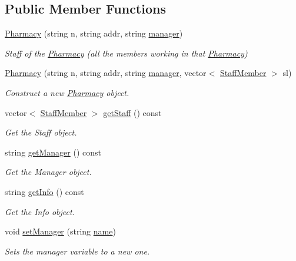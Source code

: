 \subsection*{Public Member Functions}
\begin{DoxyCompactItemize}
\item 
\hyperlink{classPharmacy_ad12ac7a309d2e77742508ecc7bee4453}{Pharmacy} (string n, string addr, string \hyperlink{classPharmacy_a620e101128be08b27f4401d53cfc39e6}{manager})
\begin{DoxyCompactList}\small\item\em Staff of the \hyperlink{classPharmacy}{Pharmacy} (all the members working in that \hyperlink{classPharmacy}{Pharmacy}) \end{DoxyCompactList}\item 
\hyperlink{classPharmacy_adb2b31d515bdf655ac3a952320a09680}{Pharmacy} (string n, string addr, string \hyperlink{classPharmacy_a620e101128be08b27f4401d53cfc39e6}{manager}, vector$<$ \hyperlink{classStaffMember}{Staff\+Member} $>$ sl)
\begin{DoxyCompactList}\small\item\em Construct a new \hyperlink{classPharmacy}{Pharmacy} object. \end{DoxyCompactList}\item 
vector$<$ \hyperlink{classStaffMember}{Staff\+Member} $>$ \hyperlink{classPharmacy_a030c21293a003be529663642a6825590}{get\+Staff} () const
\begin{DoxyCompactList}\small\item\em Get the Staff object. \end{DoxyCompactList}\item 
string \hyperlink{classPharmacy_acfa4217d82d6276e3e82991fdbb3fd13}{get\+Manager} () const
\begin{DoxyCompactList}\small\item\em Get the Manager object. \end{DoxyCompactList}\item 
string \hyperlink{classPharmacy_ac7e9631fe5f7e38e838a83a4118bbbf8}{get\+Info} () const
\begin{DoxyCompactList}\small\item\em Get the Info object. \end{DoxyCompactList}\item 
void \hyperlink{classPharmacy_a5c153e1ed72cfd0f824d43a1660c338d}{set\+Manager} (string \hyperlink{classEntity_afb45718695f537c330a463168616c262}{name})
\begin{DoxyCompactList}\small\item\em Sets the manager variable to a new one. \end{DoxyCompactList}\item 

\end{DoxyCompactItemize}
